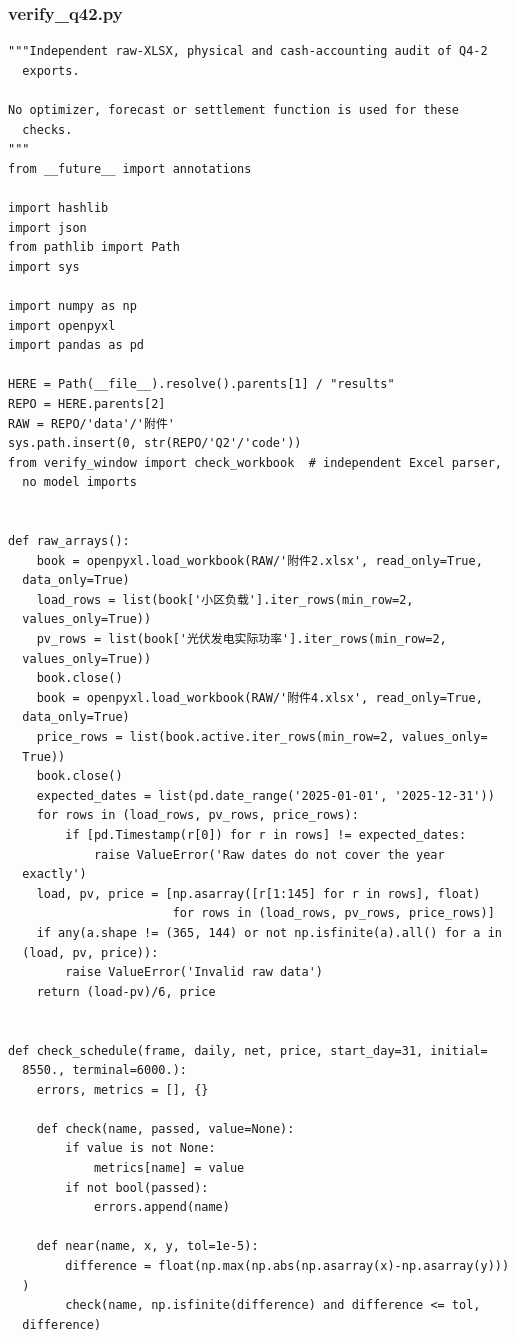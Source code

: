 \subsubsection*{verify\_q42.py}
\begin{verbatim}
"""Independent raw-XLSX, physical and cash-accounting audit of Q4-2
  exports.

No optimizer, forecast or settlement function is used for these
  checks.
"""
from __future__ import annotations

import hashlib
import json
from pathlib import Path
import sys

import numpy as np
import openpyxl
import pandas as pd

HERE = Path(__file__).resolve().parents[1] / "results"
REPO = HERE.parents[2]
RAW = REPO/'data'/'附件'
sys.path.insert(0, str(REPO/'Q2'/'code'))
from verify_window import check_workbook  # independent Excel parser,
  no model imports


def raw_arrays():
    book = openpyxl.load_workbook(RAW/'附件2.xlsx', read_only=True,
  data_only=True)
    load_rows = list(book['小区负载'].iter_rows(min_row=2,
  values_only=True))
    pv_rows = list(book['光伏发电实际功率'].iter_rows(min_row=2,
  values_only=True))
    book.close()
    book = openpyxl.load_workbook(RAW/'附件4.xlsx', read_only=True,
  data_only=True)
    price_rows = list(book.active.iter_rows(min_row=2, values_only=
  True))
    book.close()
    expected_dates = list(pd.date_range('2025-01-01', '2025-12-31'))
    for rows in (load_rows, pv_rows, price_rows):
        if [pd.Timestamp(r[0]) for r in rows] != expected_dates:
            raise ValueError('Raw dates do not cover the year
  exactly')
    load, pv, price = [np.asarray([r[1:145] for r in rows], float)
                       for rows in (load_rows, pv_rows, price_rows)]
    if any(a.shape != (365, 144) or not np.isfinite(a).all() for a in
  (load, pv, price)):
        raise ValueError('Invalid raw data')
    return (load-pv)/6, price


def check_schedule(frame, daily, net, price, start_day=31, initial=
  8550., terminal=6000.):
    errors, metrics = [], {}

    def check(name, passed, value=None):
        if value is not None:
            metrics[name] = value
        if not bool(passed):
            errors.append(name)

    def near(name, x, y, tol=1e-5):
        difference = float(np.max(np.abs(np.asarray(x)-np.asarray(y)))
  )
        check(name, np.isfinite(difference) and difference <= tol,
  difference)


\end{verbatim}
